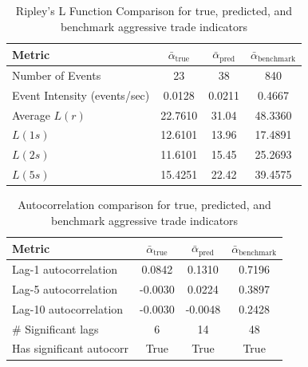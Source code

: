 \begin{table}[H]
    \centering
    \begin{tabular}{lccc}
    \toprule
    \textbf{Metric} & $\bar{\alpha}_\text{true}$ & $\bar{\alpha}_\text{pred}$ & $\bar{\alpha}_\text{benchmark}$ \\
    \midrule
    Number of Events & 23 & 38 & 840 \\
    Event Intensity (events/sec) & 0.0128 & 0.0211 & 0.4667 \\
    Average \( L(r) \) & 22.7610 & 31.04 & 48.3360 \\
    \( L(1s) \) & 12.6101 & 13.96 & 17.4891\\
    \( L(2s) \) & 11.6101 & 15.45 & 25.2693\\
    \( L(5s) \) & 15.4251 & 22.42 & 39.4575\\
    \bottomrule
    \end{tabular}
    \caption{Ripley's L Function Comparison for true, predicted, and benchmark aggressive trade indicators}    
    \label{tb:ripley-l_com}
\end{table}


\begin{table}[htbp]
\centering
\begin{tabular}{lccc}
\toprule
\textbf{Metric} & $\bar{\alpha}_{\text{true}}$ & $\bar{\alpha}_{\text{pred}}$ & $\bar{\alpha}_{\text{benchmark}}$ \\
\midrule
Lag-1 autocorrelation       & 0.0842  & 0.1310  & 0.7196  \\
Lag-5 autocorrelation       & -0.0030 & 0.0224  & 0.3897  \\
Lag-10 autocorrelation      & -0.0030 & -0.0048 & 0.2428  \\
\# Significant lags         & 6       & 14      & 48      \\
Has significant autocorr    & True    & True    & True    \\
\bottomrule
\end{tabular}
\caption{Autocorrelation comparison for true, predicted, and benchmark aggressive trade indicators}
\label{tab:acf-series-com}
\end{table}

